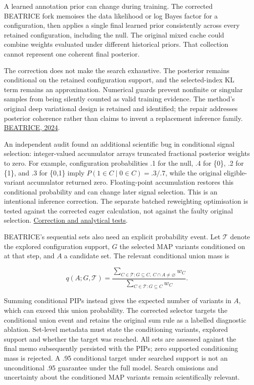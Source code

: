 \documentclass[
  british,
  10pt,
]{article}
\begin{document}
A learned annotation prior can change during training. The corrected
BEATRICE fork memoises the data likelihood or log Bayes factor for a
configuration, then applies a single final learned prior consistently
across every retained configuration, including the null. The original
mixed cache could combine weights evaluated under different historical
priors. That collection cannot represent one coherent final posterior.

The correction does not make the search exhaustive. The posterior
remains conditional on the retained configuration support, and the
selected-index KL term remains an approximation. Numerical guards
prevent nonfinite or singular samples from being silently counted as
valid training evidence. The method's original deep variational design
is retained and identified; the repair addresses posterior coherence
rather than claims to invent a replacement inference family.
\href{https://doi.org/10.1093/bioinformatics/btae590}{BEATRICE, 2024}.

An independent audit found an additional scientific bug in conditional
signal selection: integer-valued accumulator arrays truncated fractional
posterior weights to zero. For example, configuration probabilities .1
for the null, .4 for \{0\}, .2 for \{1\}, and .3 for \{0,1\} imply
\(P(1\in C\mid0\in C)=.3/.7\), while the original eligible-variant
accumulator returned zero. Floating-point accumulation restores this
conditional probability and can change later signal selection. This is
an intentional inference correction. The separate batched reweighting
optimisation is tested against the corrected eager calculation, not
against the faulty original selection.
\href{../docs/beatrice-batched-reweighting.md}{Correction and analytical
tests}.

BEATRICE's sequential sets also need an explicit probability event. Let
\(\mathcal T\) denote the explored configuration support, \(G\) the
selected MAP variants conditioned on at that step, and \(A\) a candidate
set. The relevant conditional union mass is

\[q(A;G,\mathcal T)=
\frac{\sum_{C\in\mathcal T:G\subseteq C,\ C\cap A\ne\varnothing}w_C}
{\sum_{C\in\mathcal T:G\subseteq C}w_C}.\]

Summing conditional PIPs instead gives the expected number of variants
in \(A\), which can exceed this union probability. The corrected
selector targets the conditional union event and retains the original
sum rule as a labelled diagnostic ablation. Set-level metadata must
state the conditioning variants, explored support and whether the target
was reached. All sets are assessed against the final memo subsequently
persisted with the PIPs; zero supported conditioning mass is rejected. A
.95 conditional target under searched support is not an unconditional
.95 guarantee under the full model. Search omissions and uncertainty
about the conditioned MAP variants remain scientifically relevant.
\end{document}
